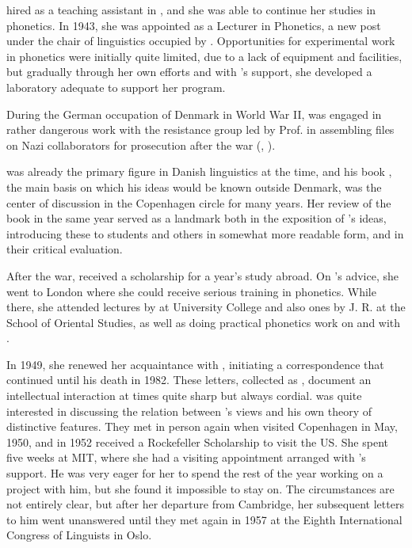 {\Hammerich} hired {\Eli} as a teaching assistant in , and she was
able to continue her studies in phonetics. In 1943, she was appointed
as a Lecturer in Phonetics, a new post under the chair of linguistics
occupied by {\Hjelmslev}. Opportunities for experimental work in
phonetics were initially quite limited, due to a lack of equipment and
facilities, but gradually through her own efforts and with {\Hjelmslev}'s
support, she developed a laboratory adequate to support her program.

During the {German} occupation of Denmark in World War II, {\Eli} was
engaged in rather dangerous work with the resistance group led by
Prof.  in assembling files on Nazi collaborators for
prosecution after the war (\citealt[67ff.]{skytte16:eli},
\citealt{efj.ege05:resistance}).

{\Hjelmslev} was already the primary figure in {Danish} linguistics at the
time, and his book \citealt{hjelmslev43:prolegomena}, the main basis
on which his ideas would be known outside Denmark, was the center of
discussion in the Copenhagen circle for many years. Her review of the
book \citep{efj43:rvw.hjelmslev} in the same year served as a landmark
both in the exposition of {\Hjelmslev}'s ideas, introducing these to
students and others in somewhat more readable form, and in their
critical evaluation.

After the war, {\Eli} received a scholarship for a year's study abroad.
On {\Hjelmslev}'s advice, she went to London where she could receive
serious training in phonetics. While there, she attended lectures by
 at University College and also ones by J. R. {\Firth} at the
School of Oriental Studies, as well as doing practical phonetics work
on  and  with .

In 1949, she renewed her acquaintance with , initiating
a correspondence that continued until his death in 1982. These
letters, collected as \citealt{early.years:efj-rj.letters}, document
an intellectual interaction at times quite sharp but always
cordial. {\Jakobson} was quite interested in discussing the relation
between {\Hjelmslev}'s views and his own theory of distinctive
features. They met in person again when {\Jakobson} visited Copenhagen in
May, 1950, and in 1952 {\Eli} received a Rockefeller Scholarship to visit
the US. She spent five weeks at MIT, where she had a visiting
appointment arranged with {\Jakobson}'s support. He was very eager for
her to spend the rest of the year working on a project with him, but
she found it impossible to stay on. The circumstances are not entirely
clear, but after her departure from Cambridge, her subsequent letters
to him went unanswered until they met again in 1957 at the Eighth
{International Congress of Linguists} in Oslo.

